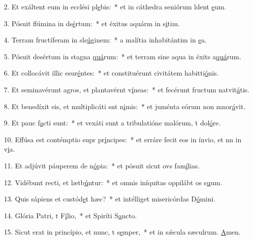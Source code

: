 2. Et exáltent eum in ecclési pl\uline{e}bis:~* et in cáthedra seniórum ldent \uline{e}um.\par 
3. Pósuit flúmina in ds\uline{é}rtum:~* et éxitus aquárm in s\uline{i}tim.\par 
4. Terram fructíferam in sls\uline{ú}ginem:~* a malítia inhabitántim in \uline{e}a.\par 
5. Pósuit desértum in stagna \uline{quá}rum:~* et terram sine aqua in éxits a\uline{quá}rum.\par 
6. Et collocávit illic esur\uline{é}ntes:~* et constituérunt civitátem habitti\uline{ó}nis.\par 
7. Et seminavérunt agros, et plantavérnt v\uline{í}neas:~* et fecérunt fructum natvit\uline{á}tis.\par 
8. Et benedíxit eis, et multiplicáti snt n\uline{i}mis:~* et juménta eórum non mnor\uline{á}vit.\par 
9. Et pauc f\uline{a}cti sunt:~* et vexáti sunt a tribulatióne malórum, t dol\uline{ó}re.\par 
10. Effúsa est contémptio supr pr\uline{í}ncipes:~* et erráre fecit eos in ínvio, et nn in v\uline{i}a.\par 
11. Et adjúvit páuperem de n\uline{ó}pia:~* et pósuit sicut ovs fam\uline{í}lias.\par 
12. Vidébunt recti, et lætb\uline{ú}ntur:~* et omnis iníquitas oppilábt os s\uline{u}um.\par 
13. Quis sápiens et custód\uline{e}t hæc?~* et intélliget misericórdas D\uline{ó}mini.\par 
14. Glória Patri, t F\uline{í}lio,~* et Spiríti S\uline{a}ncto.\par 
15. Sicut erat in princípio, et nunc, t s\uline{e}mper,~* et in sǽcula sæculrum. \uline{A}men.\par 
